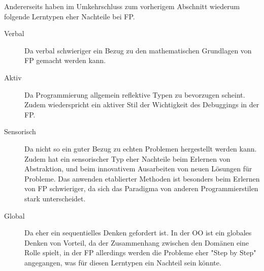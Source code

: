 Andererseits haben im Umkehrschluss zum vorherigem Abschnitt wiederum folgende Lerntypen eher Nachteile bei FP.

\begin{description}
    \item[Verbal] Da verbal schwieriger ein Bezug zu den mathematischen Grundlagen von FP gemacht werden kann.
    \item[Aktiv] Da Programmierung allgemein reflektive Typen zu bevorzugen scheint. Zudem wiederspricht ein aktiver Stil der Wichtigkeit des Debuggings in der FP.
    \item[Sensorisch] Da nicht so ein guter Bezug zu echten Problemen hergestellt werden kann. Zudem hat ein sensorischer Typ eher Nachteile beim Erlernen von Abstraktion, und beim innovativem Ausarbeiten von neuen Lösungen für Probleme. Das anwenden etablierter Methoden ist besonders beim Erlernen von FP schwieriger, da sich das Paradigma von anderen Programmierstilen stark unterscheidet.
    \item[Global] Da eher ein sequentielles Denken gefordert ist. In der OO ist ein globales Denken von Vorteil, da der Zusammenhang zwischen den Domänen eine Rolle spielt, in der FP allerdings werden die Probleme eher "Step by Step" angegangen, was für diesen Lerntypen ein Nachteil sein könnte.
\end{description}